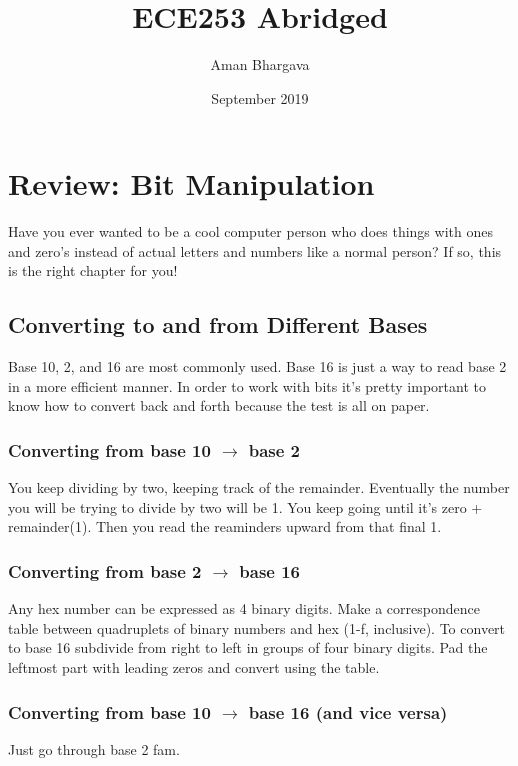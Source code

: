 \documentclass[a4paper,12pt]{report}
\begin{document}
\title{ECE253 Abridged}
\author{Aman Bhargava}
\date{September 2019}
\maketitle

\tableofcontents

\pagebreak

\chapter{Review: Bit Manipulation}
Have you ever wanted to be a cool computer person who does things with ones and zero's instead of actual letters and numbers like a normal person? If so, this is the right chapter for you!

\section{Converting to and from Different Bases}
Base 10, 2, and 16 are most commonly used. Base 16 is just a way to read base 2 in a more efficient manner. In order to work with bits it's pretty important to know how to convert back and forth because the test is all on paper. 

\subsection{Converting from base 10 $\to$ base 2}
You keep dividing by two, keeping track of the remainder. Eventually the number you will be trying to divide by two will be 1. You keep going until it's zero + remainder(1). Then you read the reaminders upward from that final 1.

\subsection{Converting from base 2 $\to$ base 16}
Any hex number can be expressed as 4 binary digits. Make a correspondence table between quadruplets of binary numbers and hex (1-f, inclusive). To convert to base 16 subdivide from right to left in groups of four binary digits. Pad the leftmost part with leading zeros and convert using the table. 

\subsection{Converting from base 10 $\to$ base 16 (and vice versa)}
Just go through base 2 fam.
\end{document}
